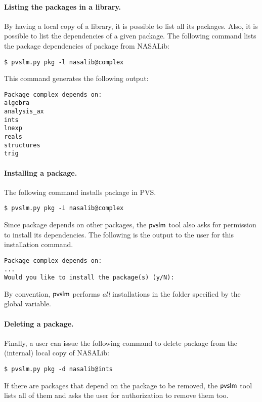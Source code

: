 \paragraph{Listing the packages in a library.} By having a local
copy of a library, it is possible to list all its packages. Also, it
is possible to list the dependencies of a given package. The following
command lists the package dependencies of package  from
NASALib:
%
\begin{verbatim}
$ pvslm.py pkg -l nasalib@complex
\end{verbatim}
%
This command generates the following output:
%
\begin{verbatim}
Package complex depends on:
algebra
analysis_ax
ints
lnexp
reals
structures
trig
\end{verbatim}

\paragraph{Installing a package.} The following command installs package
 in PVS.
%
\begin{verbatim}
$ pvslm.py pkg -i nasalib@complex
\end{verbatim}
%
Since package  depends on other packages, the $\textsf{pvslm}$
tool also asks for permission to install its dependencies. The
following is the output to the user for this installation command.
%
\begin{verbatim}
Package complex depends on:
...
Would you like to install the package(s) (y/N): 
\end{verbatim}
%
By convention, $\textsf{pvslm}$ performs {\em all} installations in the folder
specified by the  global variable.

\paragraph{Deleting a package.} Finally, a user can issue the following
command to delete package  from the (internal) local copy of
NASALib:
%
\begin{verbatim}
$ pvslm.py pkg -d nasalib@ints
\end{verbatim}
%
If there are packages that depend on the package to be removed, the $\textsf{pvslm}$ tool
lists all of them and asks the user for authorization to remove them
too.
